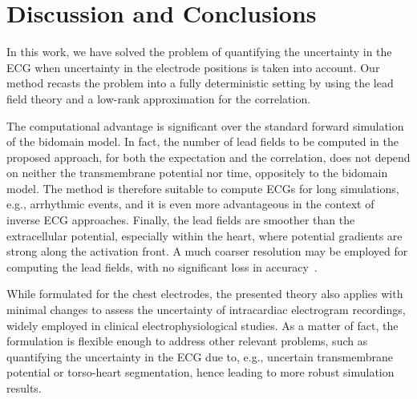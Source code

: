 \documentclass[runningheads]{llncs}
\begin{document}
\section{Discussion and Conclusions}
\label{sec:conc}

In this work, we have solved the problem of quantifying the uncertainty
in the ECG when uncertainty in the electrode positions is taken into account.
Our method recasts the
problem into a fully deterministic setting by using the lead field theory
and a low-rank approximation for the correlation.

The computational advantage
is significant over the standard forward simulation of the bidomain model.
In fact, the number of lead fields to be computed in the proposed approach,
for both the expectation and the correlation, does not depend on neither the 
transmembrane potential nor time, oppositely to the bidomain model.
The method is therefore
suitable to compute ECGs for long simulations, e.g., arrhythmic events,
and it is even more advantageous in the context of inverse ECG approaches.
Finally, the lead fields are smoother than the extracellular potential,
especially within the heart, where potential gradients are strong along the activation front.  A much coarser resolution may be employed for computing
the lead fields, with no significant loss in accuracy~\cite{potse2018}.

While formulated for the chest electrodes, the presented theory
also applies with minimal changes to assess the uncertainty of intracardiac
electrogram recordings, widely employed in clinical electrophysiological studies.
As a matter of fact, the formulation is flexible enough to address other relevant problems,
such as quantifying the uncertainty in the ECG due to, e.g., uncertain
transmembrane potential or torso-heart segmentation, hence leading
to more robust simulation results.



\end{document}
